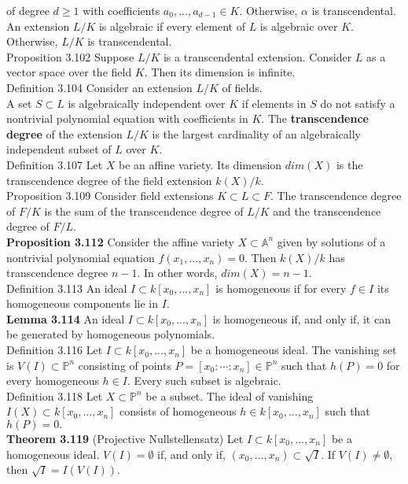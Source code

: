 \documentclass[8pt]{extarticle}
\begin{document}
of degree $d \ge 1$ with coefficients $a_0,...,a_{d-1} \in K.$ Otherwise, $\alpha$ is transcendental.\\
An extension $L/K$ is algebraic if every element of $L$ is algebraic over $K.$ Otherwise, $L/K$ is transcendental.\\
Proposition 3.102 Suppose $L/K$ is a transcendental extension. Consider $L$ as a vector space over the field $K.$ Then its dimension is infinite.\\
Definition 3.104 Consider an extension $L/K$ of fields.\\
A set $S \subset L$ is algebraically independent over $K$ if elements in $S$ do not satisfy a nontrivial polynomial equation with coefficients in $K.$
The \textbf{transcendence degree} of the extension $L/K$ is the largest cardinality of an algebraically independent subset of $L$ over $K.$\\
Definition 3.107 Let $X$ be an affine variety. Its dimension $dim(X)$ is the transcendence degree of the field extension $k(X)/k.$\\
Proposition 3.109 Consider field extensions $K \subset L \subset F.$ The transcendence degree of $F/K$ is the sum of the transcendence degree of $L/K$ and the transcendence degree of $F/L.$\\
\textbf{Proposition 3.112} Consider the affine variety $X \subset \mathbb{A}^n$ given by solutions of a nontrivial polynomial equation $f(x_1,...,x_n)=0.$ Then $k(X)/k$ has transcendence degree $n-1.$ In other words, $dim(X)=n-1.$\\
Definition 3.113 An ideal $I \subset k[x_0,..., x_n]$ is homogeneous if for every $f \in I$ its homogeneous components lie in $I.$\\
\textbf{Lemma 3.114} An ideal $I \subset k[x_0,..., x_n]$ is homogeneous if, and only if, it can be generated by homogeneous polynomials.\\
Definition 3.116 Let $I \subset k[x_0,..., x_n]$ be a homogeneous ideal. The vanishing set is $V(I) \subset \mathbb{P}^n$ consisting of points $P = [x_0 : \cdots : x_n] \in \mathbb{P}^n$ such that $h(P) = 0$ for every homogeneous $h \in I.$ Every such subset is algebraic.\\
Definition 3.118 Let $X \subset \mathbb{P}^n$ be a subset. The ideal of vanishing $I(X) \subset k[x_0,...,x_n]$ consists of homogeneous $h \in k[x_0,...,x_n]$ such that $h(P) = 0.$\\
\textbf{Theorem 3.119} (Projective Nullstellensatz) Let $I \subset k[x_0,..., x_n]$ be a homogeneous ideal. $V(I) = \emptyset$ if, and only if, $(x_0,...,x_n) \subset \sqrt{I}.$ If $V(I) \neq \emptyset,$ then $\sqrt{I}=I(V(I)).$\\
\end{document}
